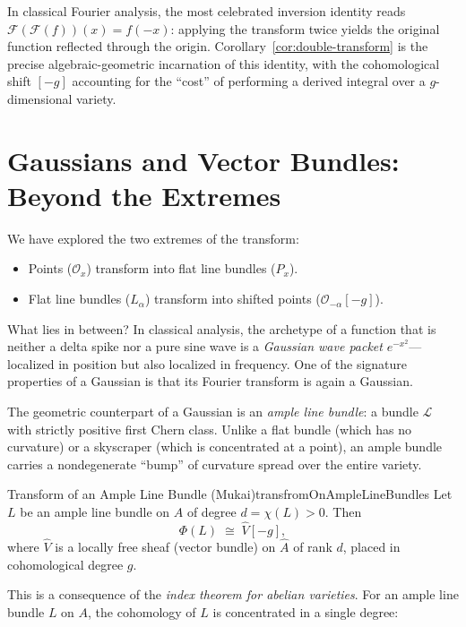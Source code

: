 \documentclass{article}
\newcommand{\CF}{{\mathcal{F}}}
\newcommand{\CL}{{\mathcal{L}}}
\newcommand{\CO}{{\mathcal{O}}}
\begin{document}
In classical Fourier analysis, the most celebrated inversion identity reads $\CF(\CF(f))(x) = f(-x)$: applying the transform twice yields the original function reflected through the origin. Corollary~\ref{cor:double-transform} is the precise algebraic-geometric incarnation of this identity, with the cohomological shift $[-g]$ accounting for the ``cost'' of performing a derived integral over a $g$-dimensional variety.


\section{Gaussians and Vector Bundles: Beyond the Extremes}

We have explored the two extremes of the transform:
\begin{itemize}
    \item Points ($\CO_x$) transform into flat line bundles ($P_x$).
    \item Flat line bundles ($L_\alpha$) transform into shifted points ($\CO_{-\alpha}[-g]$).
\end{itemize}

What lies in between? In classical analysis, the archetype of a function that is neither a delta spike nor a pure sine wave is a \emph{Gaussian wave packet} $e^{-x^2}$---localized in position but also localized in frequency. One of the signature properties of a Gaussian is that its Fourier transform is again a Gaussian.

The geometric counterpart of a Gaussian is an \emph{ample line bundle}: a bundle $\CL$ with strictly positive first Chern class. Unlike a flat bundle (which has no curvature) or a skyscraper (which is concentrated at a point), an ample bundle carries a nondegenerate ``bump'' of curvature spread over the entire variety.

\begin{thm}{Transform of an Ample Line Bundle (Mukai)}{transfromOnAmpleLineBundles}
Let $L$ be an ample line bundle on $A$ of degree $d = \chi(L) > 0$. Then
\[
    \Phi(L) \;\cong\; \hat{V}[-g],
\]
where $\hat{V}$ is a locally free sheaf (vector bundle) on $\hat{A}$ of rank $d$, placed in cohomological degree $g$.
\end{thm}

This is a consequence of the \emph{index theorem for abelian varieties}. For an ample line bundle $L$ on $A$, the cohomology of $L$ is concentrated in a single degree:
\end{document}
